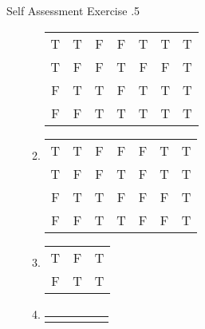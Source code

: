 \documentclass[../notes.tex]{subfiles}
\begin{document}
\begin{exercise}{Self Assessment Exercise \thechapter.5}
\begin{enumerate}
\begin{enumerate}
\begin{center}
\begin{tabular}{| c c | c c | c | c | c |}
										\hline
										T & T & F & F & T & T & T\\
										T & F & F & T & F & F & T\\
										F & T & T & F & T & T & T\\
										F & F & T & T & T & T & T\\
										\hline
									\end{tabular}
								\end{center}
							\item {}
								\begin{center}
									\begin{tabular}{|c c | c  c | c | c | c |}
										\hline
										\tablehead{$p$} & \tablehead{$q$} & \tablehead{$\lnot p$} & \tablehead{$\lnot q$} & \tablehead{$q \land \lnot q$} & \tablehead{$ \lnot p \rightarrow (q \land \lnot q)$} & \tablehead{$[\lnot p \rightarrow (q \land \lnot q)] \rightarrow p$}\\
										\hline
										T & T & F & F & F & T & T\\
										T & F & F & T & F & T & T\\
										F & T & T & F & F & F & T\\
										F & F & T & T & F & F & T\\
										\hline
									\end{tabular}
								\end{center}
							\item \question{$p \lor (\lnot p)$}
								\begin{center}
									\begin{tabular}{| c | c | c |}
										\hline
										\tablehead{$p$} & \tablehead{$\lnot p$} & \tablehead{$p \lor \lnot p$}\\
										\hline
										T & F & T\\
										F & T & T\\
										\hline
									\end{tabular}
								\end{center}
							\item \question{$\bigl[p \land (p \rightarrow q)\bigr] \rightarrow q$}
								\begin{center}
									\begin{tabular}{| c c | c | c | c |}
										\hline
										\tablehead{$p$} & \tablehead{$q$} & \tablehead{$p \rightarrow q$} & \tablehead{$p \land (p \rightarrow q)$} & \tablehead{$[p \land (p \rightarrow q)] \rightarrow q$}\\

\end{tabular}
\end{center}
\end{enumerate}
\end{enumerate}
\end{exercise}
\end{document}
